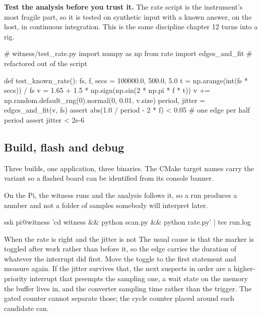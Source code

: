\begin{steps}
\item \textbf{Test the analysis before you trust it.} The rate script is the
instrument's most fragile part, so it is tested on synthetic input with a known
answer, on the host, in continuous integration. This is the same discipline
chapter 12 turns into a rig.
\begin{pycode}
# witness/test_rate.py
import numpy as np
from rate import edges_and_fit       # refactored out of the script

def test_known_rate():
    fs, f, secs = 100000.0, 500.0, 5.0
    t = np.arange(int(fs * secs)) / fs
    v = 1.65 + 1.5 * np.sign(np.sin(2 * np.pi * f * t))
    v += np.random.default_rng(0).normal(0, 0.01, v.size)
    period, jitter = edges_and_fit(v, fs)
    assert abs(1.0 / period - 2 * f) < 0.05     # one edge per half period
    assert jitter < 2e-6
\end{pycode}
\end{steps}

\subsection*{Build, flash and debug}


Three builds, one application, three binaries. The CMake target names carry the
variant so a flashed board can be identified from its console banner.


On the Pi, the witness runs and the analysis follows it, so a run produces a
number and not a folder of samples somebody will interpret later.

\begin{shellcode}
ssh pi@witness 'cd witness && python scan.py && python rate.py' | tee run.log
\end{shellcode}

\begin{note}{When the rate is right and the jitter is not}
The usual cause is that the marker is toggled after work rather than before it,
so the edge carries the duration of whatever the interrupt did first. Move the
toggle to the first statement and measure again. If the jitter survives that,
the next suspects in order are a higher-priority interrupt that preempts the
sampling one, a wait state on the memory the buffer lives in, and the converter
sampling time rather than the trigger. The gated counter cannot separate those;
the cycle counter placed around each candidate can.
\end{note}

